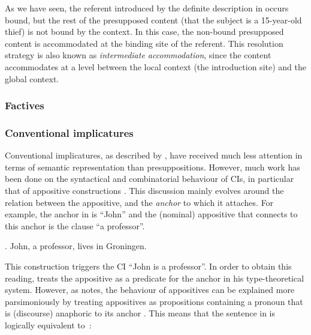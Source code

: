 As we have seen, the referent introduced by the definite description in
\Last[b] occurs bound, but the rest of the presupposed content (that the
subject is a 15-year-old thief) is not bound by the context. In this case,
the non-bound presupposed content is accommodated at the binding site of the
referent. This resolution strategy is also known as \emph{intermediate
accommodation}, since the content accommodates at a level between the local
context (the introduction site) and the global context.
%
%
%
\subsubsection{Factives}

\subsubsection{Conventional implicatures}

Conventional implicatures, as described by \citet{potts2005logic}, have
received much less attention in terms of semantic representation than
presuppositions. However, much work has been done on the syntactical and
combinatorial behaviour of CIs, in particular that of appositive
constructions \citep[see, e.g.][]{mccawley1998syntactic,
delgobbo2003appositives,nouwen2007appositives,schlenker2010supplementsi,
heringa2012appositional}.  This discussion mainly evolves around the
relation between the appositive, and the \emph{anchor} to which it attaches.
For example, the anchor in \Next is ``John'' and the (nominal) appositive
that connects to this anchor is the clause ``a professor''.

\ex. John, a professor, lives in Groningen.

This construction triggers the CI ``John is a professor''. In order to
obtain this reading, \citet{potts2005logic} treats the appositive as
a predicate for the anchor in his type-theoretical system.  However, as
\citet{nouwen2013note} notes, the behaviour of appositives can be explained
more parsimoniously by treating appositives as propositions containing
a pronoun that is (discourse) anaphoric to its anchor
\citep[following][]{delgobbo2003appositives}. This means that the sentence
in \Last is logically equivalent to~\Next: 


